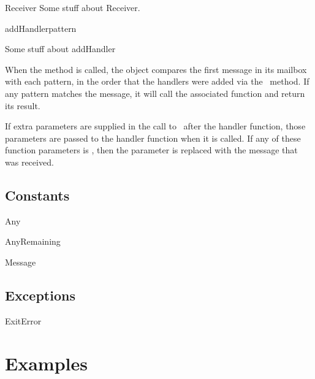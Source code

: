 \documentclass{howto}
\begin{document}
\begin{classdesc}{Receiver}{}
Some stuff about Receiver.

\begin{methoddesc}{addHandler}{pattern}

Some stuff about addHandler

When the  method is called, the 
object compares the first message in its mailbox with each pattern, in the order
that the handlers were added via the \addhandler\ method. If any pattern matches
the message, it will call the associated function and return its result.

If extra parameters are supplied in the call to \addhandler\ after the handler
function, those parameters are passed to the handler function when it is called.
If any of these function parameters is , then the
parameter is replaced with the message that was received.
\end{methoddesc}

\end{classdesc}



\subsection{Constants}

\begin{datadesc}{Any}
\end{datadesc}

\begin{datadesc}{AnyRemaining}
\end{datadesc}

\begin{datadesc}{Message}
\end{datadesc}



\subsection{Exceptions}

\begin{excdesc}{ExitError}
\end{excdesc}



\section{Examples}
\end{document}
